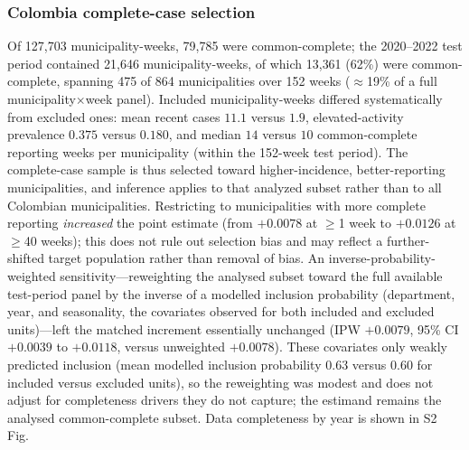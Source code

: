 \documentclass[11pt,a4paper]{article}
\begin{document}
\subsubsection*{Colombia complete-case selection}
Of 127{,}703 municipality-weeks, 79{,}785 were common-complete; the 2020--2022 test period contained 21{,}646 municipality-weeks, of which 13{,}361 (62\%) were common-complete, spanning 475 of 864 municipalities over 152 weeks ($\approx$19\% of a full municipality$\times$week panel). Included municipality-weeks differed systematically from excluded ones: mean recent cases $11.1$ versus $1.9$, elevated-activity prevalence $0.375$ versus $0.180$, and median $14$ versus $10$ common-complete reporting weeks per municipality (within the 152-week test period). The complete-case sample is thus selected toward higher-incidence, better-reporting municipalities, and inference applies to that analyzed subset rather than to all Colombian municipalities. Restricting to municipalities with more complete reporting \emph{increased} the point estimate (from $+0.0078$ at $\geq$1 week to $+0.0126$ at $\geq$40 weeks); this does not rule out selection bias and may reflect a further-shifted target population rather than removal of bias. An inverse-probability-weighted sensitivity---reweighting the analysed subset toward the full available test-period panel by the inverse of a modelled inclusion probability (department, year, and seasonality, the covariates observed for both included and excluded units)---left the matched increment essentially unchanged (IPW $+0.0079$, 95\% CI $+0.0039$ to $+0.0118$, versus unweighted $+0.0078$). These covariates only weakly predicted inclusion (mean modelled inclusion probability $0.63$ versus $0.60$ for included versus excluded units), so the reweighting was modest and does not adjust for completeness drivers they do not capture; the estimand remains the analysed common-complete subset. Data completeness by year is shown in S2 Fig.
\end{document}
